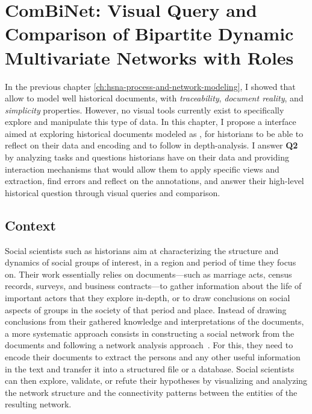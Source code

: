 \chapter{ComBiNet: Visual Query and Comparison of Bipartite Dynamic Multivariate Networks with Roles}\label{ch:combinet}
\minitoc

In the previous chapter \autoref{ch:hsna-process-and-network-modeling}, I showed that \modelplural allow to model well historical documents, with \emph{traceability}, \emph{document reality}, and \emph{simplicity} properties.
However, no visual tools currently exist to specifically explore and manipulate this type of data.
In this chapter, I propose a \va interface aimed at exploring historical documents modeled as \modelplural, for historians to be able to reflect on their data and encoding and to follow in depth-analysis.
I answer \textbf{Q2} by analyzing tasks and questions historians have on their data and providing interaction mechanisms that would allow them to apply specific views and extraction, find errors and reflect on the annotations, and answer their high-level historical question through visual queries and comparison.


\section{Context}

Social scientists such as historians aim at characterizing the structure and dynamics of social groups of interest, in a region and period of time they focus on\cite{tilly1984retrieving}.
Their work essentially relies on documents---such as marriage acts, census records, surveys, and business contracts---to gather information about the life of important actors that they explore in-depth, or to draw conclusions on social aspects of groups in the society of that period and place.
Instead of drawing conclusions from their gathered knowledge and interpretations of the documents, a more systematic approach consists in constructing a social network from the documents and following a network analysis approach~\cite{wetherellHistoricalSocialNetwork1998}.
For this, they need to encode their documents to extract the persons and any other useful information in the text and transfer it into a structured file or a database.
Social scientists can then explore, validate, or refute their hypotheses by visualizing and analyzing the network structure and the connectivity patterns between the entities of the resulting network.

